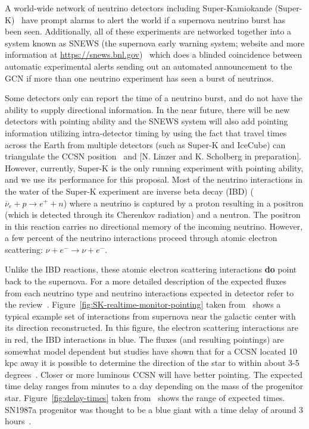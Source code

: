 \documentclass[12pt, letterpaper]{article}
\newcommand{\superk}  {Super\nobreakdash-K\xspace}
\begin{document}
A world-wide network of neutrino detectors including Super-Kamiokande
(\superk)~\cite{2003NIMPA.501..418F} have prompt alarms to alert the
world if a supernova neutrino burst has been seen.  Additionally, all
of these experiments are networked together into a system known as
SNEWS (the supernova early warning system; website and more
information at \url{https://snews.bnl.gov})~\cite{2004NJPh....6..114A}
which does a blinded coincidence between automatic experimental alerts
sending out an automated announcement to the GCN if more than one
neutrino experiment has seen a burst of neutrinos.

Some detectors only can report the time of a neutrino burst, and do
not have the ability to supply directional information.  In the near
future, there will be new detectors with pointing ability and the
SNEWS system will also add pointing information utilizing
intra-detector timing by using the fact that travel times across the
Earth from multiple detectors (such as \superk and IceCube) can
triangulate the CCSN position~\cite{2018JCAP...04..025B} and [N. Linzer
and K. Scholberg in preparation].  However, currently,
\superk is the only running experiment with pointing ability, and we
use its performance for this proposal. Most of the neutrino
interactions in the water of the \superk experiment are inverse beta
decay (IBD) ($ \overline{\nu}_{e}+ p \rightarrow e^{+} + n $) where a
neutrino is captured by a proton resulting in a positron (which is
detected through its Cherenkov radiation) and a neutron.  The positron
in this reaction carries no directional memory of the incoming
neutrino. However, a few percent of the neutrino interactions proceed
through atomic electron scattering:
$\nu + e^{-} \rightarrow \nu + e^{-} .$

Unlike the IBD reactions, these atomic electron scattering
interactions {\bf do} point back to the supernova.  For a more
detailed description of the expected fluxes from each neutrino type
and neutrino interactions expected in detector refer to the
review~\cite{2012ARNPS..62...81S}.
Figure~\ref{fig:SK-realtime-monitor-pointing} taken
from~\cite{2016APh....81...39A} shows a typical example set of
interactions from supernova near the galactic center with its
direction reconstructed.  In this figure, the electron scattering
interactions are in red, the IBD interactions in blue.  The fluxes
(and resulting pointings) are somewhat model dependent but studies
have shown that for a CCSN located 10 kpc away it is possible to
determine the direction of the star to within about 3-5
degrees~\cite{2016APh....81...39A}.  Closer or more luminous CCSN will
have better pointing.  The expected time delay ranges from minutes to
a day depending on the mass of the progenitor
star. Figure~\ref{fig:delay-times} taken
from~\cite{2013ApJ...778...81K} shows the range of expected times.
SN1987a progenitor was thought to be a blue giant with a time delay of
around 3 hours~\cite{ISAWTHISSOMWHERE}.
\end{document}
